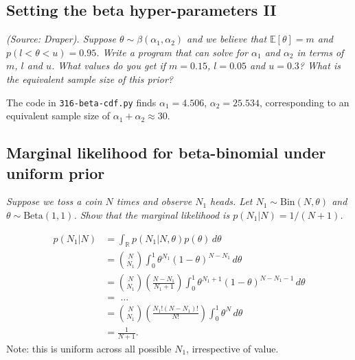 \subsection{Setting the beta hyper-parameters II}
\textit{(Source: Draper). Suppose $\theta\sim\beta(\alpha_1,\alpha_2)$ and we believe that $\mathbb{E}[\theta]=m$ and $p(l<\theta<u)=0.95$. Write a program that can solve for $\alpha_1$ and $\alpha_2$ in terms of $m$, $l$ and $u$. What values do you get if $m=0.15$, $l=0.05$ and $u=0.3$? What is the equivalent sample size of this prior?}

The code in \texttt{316-beta-cdf.py} finds $\alpha_1 = 4.506$, $\alpha_2 = 25.534$, corresponding to an equivalent sample size of $\alpha_1+\alpha_2 \approx 30$.

\subsection{Marginal likelihood for beta-binomial under uniform prior}
\textit{Suppose we toss a coin $N$ times and observe $N_1$ heads. Let $N_1\sim\text{Bin}(N,\theta)$ and $\theta\sim\text{Beta}(1,1)$. Show that the marginal likelihood is $p(N_1|N)=1/(N+1)$.}

\begin{align*}
p(N_1|N) &= \int_{\mathbb{R}} p(N_1|N,\theta)p(\theta) \,d\theta\\
&= {N \choose N_1} \int_0^1 \theta^{N_1} (1-\theta)^{N-N_1} \,d\theta\\
&= {N \choose N_1} \left(\frac{N-N_1}{N_1+1}\right) \int_0^1 \theta^{N_1+1} (1-\theta)^{N-N_1-1} \,d\theta\\
&= \,\,\dots\\
&= {N \choose N_1} \left(\frac{N_1!(N-N_1)!}{N!}\right) \int_0^1 \theta^N \,d\theta\\
&= \frac{1}{N+1}.
\end{align*}
Note: this is uniform across all possible $N_1$, irrespective of value.

